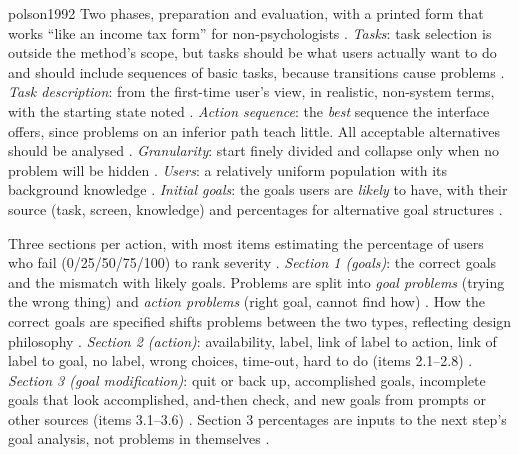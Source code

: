 \begin{papercard}{polson1992}
 Two phases, preparation and evaluation, with a printed form that works ``like an income tax form'' for non-psychologists . \emph{Tasks}: task selection is outside the method's scope, but tasks should be what users actually want to do and should include sequences of basic tasks, because transitions cause problems . \emph{Task description}: from the first-time user's view, in realistic, non-system terms, with the starting state noted . \emph{Action sequence}: the \emph{best} sequence the interface offers, since problems on an inferior path teach little. All acceptable alternatives should be analysed . \emph{Granularity}: start finely divided and collapse only when no problem will be hidden . \emph{Users}: a relatively uniform population with its background knowledge . \emph{Initial goals}: the goals users are \emph{likely} to have, with their source (task, screen, knowledge) and percentages for alternative goal structures .

 Three sections per action, with most items estimating the percentage of users who fail (0/25/50/75/100) to rank severity . \emph{Section 1 (goals)}: the correct goals and the mismatch with likely goals. Problems are split into \emph{goal problems} (trying the wrong thing) and \emph{action problems} (right goal, cannot find how) . How the correct goals are specified shifts problems between the two types, reflecting design philosophy . \emph{Section 2 (action)}: availability, label, link of label to action, link of label to goal, no label, wrong choices, time-out, hard to do (items 2.1--2.8) . \emph{Section 3 (goal modification)}: quit or back up, accomplished goals, incomplete goals that look accomplished, and-then check, and new goals from prompts or other sources (items 3.1--3.6) . Section 3 percentages are inputs to the next step's goal analysis, not problems in themselves .


\end{papercard}
